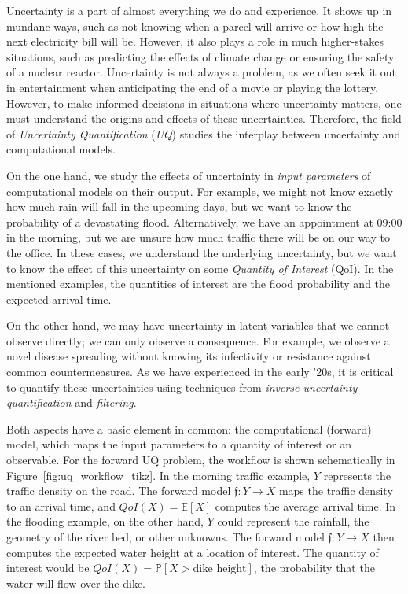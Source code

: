 Uncertainty is a part of almost everything we do and experience.
It shows up in mundane ways, such as not knowing when a parcel will arrive or how high the next electricity bill will be.
However, it also plays a role in much higher-stakes situations, such as predicting the effects of climate change or ensuring the safety of a nuclear reactor.
Uncertainty is not always a problem, as we often seek it out in entertainment when anticipating the end of a movie or playing the lottery.
However, to make informed decisions in situations where uncertainty matters, one must understand the origins and effects of these uncertainties.
Therefore, the field of \emph{Uncertainty Quantification} (\emph{UQ}) studies the interplay between uncertainty and computational models.

On the one hand, we study the effects of uncertainty in \emph{input parameters} of computational models on their output.
For example, we might not know exactly how much rain will fall in the upcoming days, but we want to know the probability of a devastating flood.
Alternatively, we have an appointment at 09:00 in the morning, but we are unsure how much traffic there will be on our way to the office.
In these cases, we understand the underlying uncertainty, but we want to know the effect of this uncertainty on some \emph{Quantity of Interest} (QoI).
In the mentioned examples, the quantities of interest are the flood probability and the expected arrival time.

On the other hand, we may have uncertainty in latent variables that we cannot observe directly; we can only observe a consequence.
For example, we observe a novel disease spreading without knowing its infectivity or resistance against common countermeasures.
As we have experienced in the early '20s, it is critical to quantify these uncertainties using techniques from \emph{inverse uncertainty quantification} and \emph{filtering}.

Both aspects have a basic element in common: the computational (forward) model, which maps the input parameters to a quantity of interest or an observable.
For the forward UQ problem, the workflow is shown schematically in Figure~\ref{fig:uq_workflow_tikz}.
In the morning traffic example, $Y$ represents the traffic density on the road.
The forward model $\mathfrak{f}:Y\to X$ maps the traffic density to an arrival time, and $QoI(X) = \mathbb{E}\left[ X \right]$ computes the average arrival time.
In the flooding example, on the other hand, $Y$ could represent the rainfall, the geometry of the river bed, or other unknowns.
The forward model $\mathfrak{f}:Y\to X$ then computes the expected water height at a location of interest.
The quantity of interest would be $QoI(X) = \mathbb{P}\left[ X > \text{dike height} \right]$, the probability that the water will flow over the dike.

